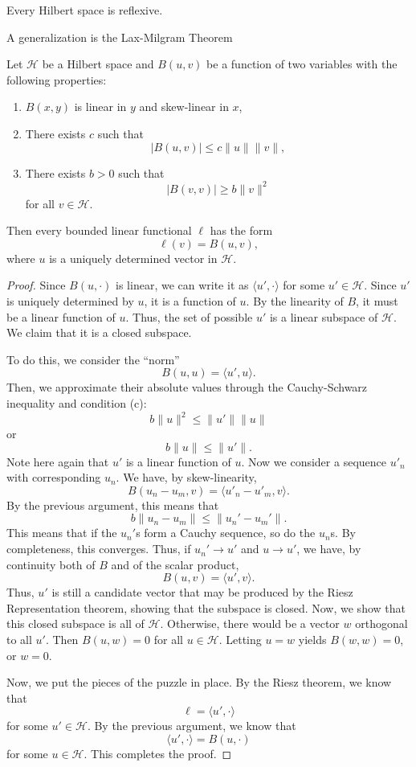 \documentclass[twoside,symmetric, openany, 12pt]{./tuftebook}
\theoremstyle{definition}
\theoremstyle{definition}
\theoremstyle{definition}
\newenvironment{parts}{\begin{enumerate}[label=(\alph*)]}{\end{enumerate}}
\begin{document}
\begin{Corollary}
	Every Hilbert space is reflexive.
\end{Corollary}
A generalization is the Lax-Milgram Theorem
\begin{Theorem}
	Let $\mathcal{H}$ be a Hilbert space and $B(u, v)$ be a function of two variables with the following properties:
	\begin{parts}
		\item $B(x,y)$ is linear in $y$ and skew-linear in $x$,
		\item There exists $c$ such that
		\[|B(u,v)|\le c \|u\| \|v\|,\]
		\item There exists $b>0$ such that
		\[|B(v,v)|\ge b\|v\|^2\]
		for all $v\in \mathcal{H}$.
	\end{parts}
Then every bounded linear functional $\ell$ has the form
\[\ell(v) = B(u, v),\]
where $u$ is a uniquely determined vector in $\mathcal{H}$.
\end{Theorem}
\begin{proof}
Since $B(u, \cdot)$ is linear, we can write it as $\langle u', \cdot \rangle$ for some $u'\in \mathcal{H}$. Since $u'$ is uniquely determined by $u$, it is a function of $u$. By the linearity of $B$, it must be a linear function of $u$. Thus, the set of possible $u'$ is a linear subspace of $\mathcal{H}$. We claim that it is a closed subspace.

To do this, we consider the ``norm''
\[B(u, u) = \langle u', u\rangle.\]
Then, we approximate their absolute values through the Cauchy-Schwarz inequality and condition (c):
\[b \| u\|^2 \le \|u'\|\|u\|\]
or
\[b \|u\| \le \|u'\|.\]
Note here again that $u'$ is a linear function of $u$. Now we consider a sequence $u'_n$ with corresponding $u_n$. We have, by skew-linearity,
\[B(u_n - u_m, v) = \langle u'_n - u'_m, v\rangle.\]
By the previous argument, this means that
\[b\|u_n-u_m\| \le \|u_n' - u_m'\|.\]
This means that if the $u_n'$s form a Cauchy sequence, so do the $u_n$s. By completeness, this converges. Thus, if $u_n'\to u'$ and $u\to u'$, we have, by continuity both of $B$ and of the scalar product,
\[B(u, v) = \langle u', v\rangle.\]
Thus, $u'$ is still a candidate vector that may be produced by the Riesz Representation theorem, showing that the subspace is closed. Now, we show that this closed subspace is all of $\mathcal{H}$. Otherwise, there would be a vector $w$ orthogonal to all $u'$. Then $B(u, w)=0$ for all $u\in \mathcal{H}$. Letting $u=w$ yields $B(w,w)=0$, or $w=0$.

Now, we put the pieces of the puzzle in place. By the Riesz theorem, we know that
\[\ell = \langle u', \cdot\rangle\]
for some $u'\in \mathcal{H}$. By the previous argument, we know that
\[\langle u',\cdot \rangle = B(u, \cdot)\]
for some $u\in \mathcal{H}$. This completes the proof.
\end{proof}
\end{document}
